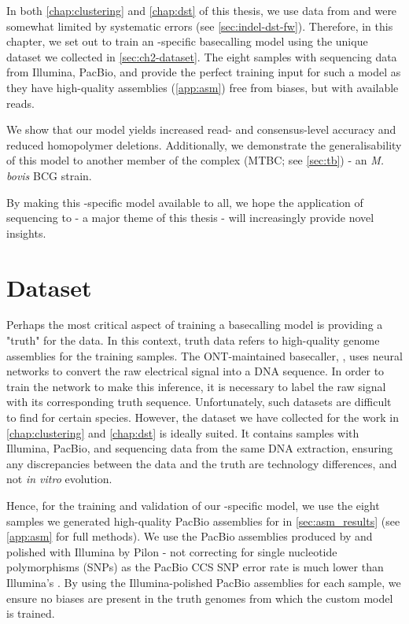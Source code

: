 In both \autoref{chap:clustering} and \autoref{chap:dst} of this thesis, we use \ont{} data from \mtb{} and were somewhat limited by systematic errors (see \autoref{sec:indel-dst-fw}). Therefore, in this chapter, we set out to train an \mtb{}-specific \ont{} basecalling model using the unique dataset we collected in \autoref{sec:ch2-dataset}. The eight samples with sequencing data from Illumina, PacBio, and \ont{} provide the perfect training input for such a model as they have high-quality assemblies (\autoref{app:asm}) free from \ont{} biases, but with available \ont{} reads.

We show that our \mtb{} \ont{} model yields increased read- and consensus-level accuracy and reduced homopolymer deletions. Additionally, we demonstrate the generalisability of this model to another member of the \mtb{} complex (MTBC; see \autoref{sec:tb}) - an \textit{M. bovis} BCG strain.

By making this \mtb{}-specific model available to all, we hope the application of \ont{} sequencing to \mtb{} - a major theme of this thesis - will increasingly provide novel insights.

\section{Dataset}
\label{sec:tubby-data}

Perhaps the most critical aspect of training a basecalling model is providing a "truth" for the data. In this context, truth data refers to high-quality genome assemblies for the training samples. The ONT-maintained basecaller, \guppy{}, uses neural networks to convert the raw electrical signal into a DNA sequence. In order to train the network to make this inference, it is necessary to label the raw signal with its corresponding truth sequence. Unfortunately, such datasets are difficult to find for certain species. However, the dataset we have collected for the work in \autoref{chap:clustering} and \autoref{chap:dst} is ideally suited. It contains samples with Illumina, PacBio, and \ont{} sequencing data from the same DNA extraction, ensuring any discrepancies between the \ont{} data and the truth are technology differences, and not \textit{in vitro} evolution. 

Hence, for the training and validation of our \mtb{}-specific model, we use the eight samples we generated high-quality PacBio assemblies for in \autoref{sec:asm_results} (see \autoref{app:asm} for full methods). We use the PacBio assemblies produced by \flye{} and polished with Illumina by Pilon - not correcting for single nucleotide polymorphisms (SNPs) as the PacBio CCS SNP error rate is much lower than Illumina's \cite{wenger2019}. By using the Illumina-polished PacBio assemblies for each sample, we ensure no \ont{} biases are present in the truth genomes from which the custom model is trained.

